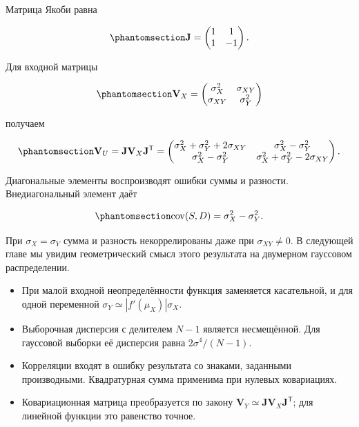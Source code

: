 \documentclass[
  russian,
  11pt,
  a4paper,
  open=any]{scrbook}
\providecommand{\tightlist}{%
  \setlength{\itemsep}{0pt}\setlength{\parskip}{0pt}}
\begin{document}
Матрица Якоби равна

\begin{equation}\protect\phantomsection\label{eq-ch6-sum-difference-jacobian}{
\mathbf J=
\begin{pmatrix}
1&1\\
1&-1
\end{pmatrix}.
}\end{equation}

Для входной матрицы

\begin{equation}\protect\phantomsection\label{eq-ch6-sum-difference-input-covariance}{
\mathbf V_X=
\begin{pmatrix}
\sigma_X^2&\sigma_{XY}\\
\sigma_{XY}&\sigma_Y^2
\end{pmatrix}
}\end{equation}

получаем

\begin{equation}\protect\phantomsection\label{eq-ch6-sum-difference-output-covariance}{
\mathbf V_U
=\mathbf J\mathbf V_X\mathbf J^{\mathsf T}
=
\begin{pmatrix}
\sigma_X^2+\sigma_Y^2+2\sigma_{XY}
&\sigma_X^2-\sigma_Y^2\\
\sigma_X^2-\sigma_Y^2
&\sigma_X^2+\sigma_Y^2-2\sigma_{XY}
\end{pmatrix}.
}\end{equation}

Диагональные элементы воспроизводят ошибки суммы и разности.
Внедиагональный элемент даёт

\begin{equation}\protect\phantomsection\label{eq-ch6-sum-difference-covariance}{
\operatorname{cov}(S,D)=\sigma_X^2-\sigma_Y^2.
}\end{equation}

При \(\sigma_X=\sigma_Y\) сумма и разность некоррелированы даже при
\(\sigma_{XY}\ne0\). В следующей главе мы увидим геометрический смысл
этого результата на двумерном гауссовом распределении.

\begin{bookchaptersummary}

\begin{itemize}
\tightlist
\item
  При малой входной неопределённости функция заменяется касательной, и
  для одной переменной \(\sigma_Y\simeq|f'(\mu_X)|\sigma_X\).
\item
  Выборочная дисперсия с делителем \(N-1\) является несмещённой. Для
  гауссовой выборки её дисперсия равна \(2\sigma^4/(N-1)\).
\item
  Корреляции входят в ошибку результата со знаками, заданными
  производными. Квадратурная сумма применима при нулевых ковариациях.
\item
  Ковариационная матрица преобразуется по закону
  \(\mathbf V_Y\simeq\mathbf J\mathbf V_X\mathbf J^{\mathsf T}\); для
  линейной функции это равенство точное.
\end{itemize}

\end{bookchaptersummary}
\end{document}
